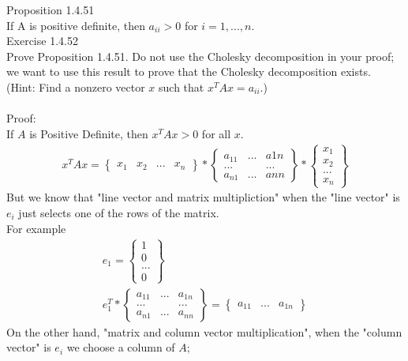 \documentclass{article}
\begin{document}
	Proposition 1.4.51\\
	If A is positive definite, then $a_{ii} > 0$ for $i = 1,..., n$. 
	\\
	Exercise 1.4.52\\
	Prove Proposition 1.4.51. Do not use the Cholesky decomposition in your 
	proof; we want to use this result to prove that the Cholesky decomposition exists.\\ 
	(Hint: Find a nonzero vector $x$ such that $x^TAx = a_{ii}$.)\\ 
	\\
	Proof:\\
	If $A$ is Positive Definite, then $x^TAx > 0$ for all $x$.
	\begin{align*}
		x^TAx = \begin{Bmatrix}x_1&x_2&...&x_n\end{Bmatrix}*\begin{Bmatrix}
		a_{11} & ... & a{1n}\\
		... & & ...\\
		a_{n1} & ... & a{nn}		
		\end{Bmatrix}*\begin{Bmatrix}x_1\\x_2\\...\\x_n\end{Bmatrix}
	\end{align*}
	But we know that "line vector and matrix multipliction" when the "line vector" is $e_i$ just selects one of the rows of the matrix.\\
	For example
	\begin{align*}
		e_1 = \begin{Bmatrix}1\\0\\...\\0\end{Bmatrix}\\
		e_1^T*\begin{Bmatrix}
		a_{11} & ... & a_{1n}\\
		... & & ...\\
		a_{n1} & ... & a_{nn}		
		\end{Bmatrix} = \begin{Bmatrix}a_{11} & ... & a_{1n} \end{Bmatrix}
	\end{align*}
	On the other hand, "matrix and column vector multiplication", when the "column vector" is $e_i$ we choose a column of $A$;
\end{document}
